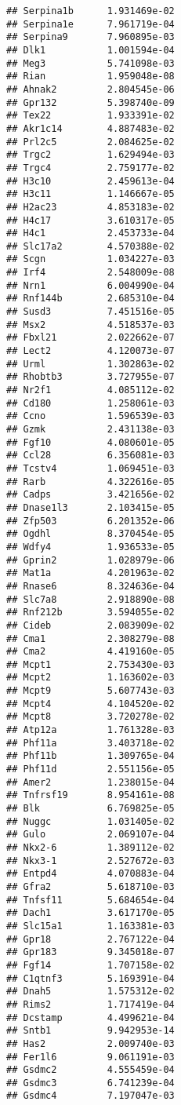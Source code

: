 \documentclass[
]{article}
\begin{document}
\begin{verbatim}
## Serpina1b      1.931469e-02
## Serpina1e      7.961719e-04
## Serpina9       7.960895e-03
## Dlk1           1.001594e-04
## Meg3           5.741098e-03
## Rian           1.959048e-08
## Ahnak2         2.804545e-06
## Gpr132         5.398740e-09
## Tex22          1.933391e-02
## Akr1c14        4.887483e-02
## Prl2c5         2.084625e-02
## Trgc2          1.629494e-03
## Trgc4          2.759177e-02
## H3c10          2.459613e-04
## H3c11          1.146667e-05
## H2ac23         4.853183e-02
## H4c17          3.610317e-05
## H4c1           2.453733e-04
## Slc17a2        4.570388e-02
## Scgn           1.034227e-03
## Irf4           2.548009e-08
## Nrn1           6.004990e-04
## Rnf144b        2.685310e-04
## Susd3          7.451516e-05
## Msx2           4.518537e-03
## Fbxl21         2.022662e-07
## Lect2          4.120073e-07
## Urml           1.302863e-02
## Rhobtb3        3.727955e-07
## Nr2f1          4.085112e-02
## Cd180          1.258061e-03
## Ccno           1.596539e-03
## Gzmk           2.431138e-03
## Fgf10          4.080601e-05
## Ccl28          6.356081e-03
## Tcstv4         1.069451e-03
## Rarb           4.322616e-05
## Cadps          3.421656e-02
## Dnase1l3       2.103415e-05
## Zfp503         6.201352e-06
## Ogdhl          8.370454e-05
## Wdfy4          1.936533e-05
## Gprin2         1.028979e-06
## Mat1a          4.201963e-02
## Rnase6         8.324636e-04
## Slc7a8         2.918890e-08
## Rnf212b        3.594055e-02
## Cideb          2.083909e-02
## Cma1           2.308279e-08
## Cma2           4.419160e-05
## Mcpt1          2.753430e-03
## Mcpt2          1.163602e-03
## Mcpt9          5.607743e-03
## Mcpt4          4.104520e-02
## Mcpt8          3.720278e-02
## Atp12a         1.761328e-03
## Phf11a         3.403718e-02
## Phf11b         1.309765e-04
## Phf11d         2.551156e-05
## Amer2          1.238015e-04
## Tnfrsf19       8.954161e-08
## Blk            6.769825e-05
## Nuggc          1.031405e-02
## Gulo           2.069107e-04
## Nkx2-6         1.389112e-02
## Nkx3-1         2.527672e-03
## Entpd4         4.070883e-04
## Gfra2          5.618710e-03
## Tnfsf11        5.684654e-04
## Dach1          3.617170e-05
## Slc15a1        1.163381e-03
## Gpr18          2.767122e-04
## Gpr183         9.345018e-07
## Fgf14          1.707158e-02
## C1qtnf3        5.169391e-04
## Dnah5          1.575312e-02
## Rims2          1.717419e-04
## Dcstamp        4.499621e-04
## Sntb1          9.942953e-14
## Has2           2.009740e-03
## Fer1l6         9.061191e-03
## Gsdmc2         4.555459e-04
## Gsdmc3         6.741239e-04
## Gsdmc4         7.197047e-03

\end{verbatim}
\end{document}
